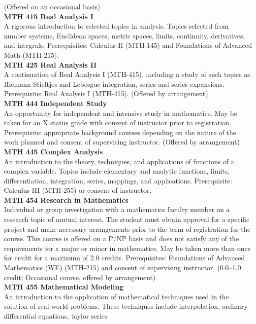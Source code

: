 \documentclass[
  letterpaper,
]{scrbook}
\begin{document}
(Offered on an occasional basis)\\
\textbf{MTH 415 Real Analysis I}\\
A rigorous introduction to selected topics in analysis. Topics selected
from number systems, Euclidean spaces, metric spaces, limits,
continuity, derivatives, and integrals. Prerequisites: Calculus II
(MTH-145) and Foundations of Advanced Math (MTH-215).\\
\textbf{MTH 425 Real Analysis II}\\
A continuation of Real Analysis I (MTH-415), including a study of such
topics as Riemann Stieltjes and Lebesgue integration, series and series
expansions. Prerequisite: Real Analysis I (MTH-415). (Offered by
arrangement)\\
\textbf{MTH 444 Independent Study}\\
An opportunity for independent and intensive study in mathematics. May
be taken for an X status grade with consent of instructor prior to
registration. Prerequisite: appropriate background courses depending on
the nature of the work planned and consent of supervising instructor.
(Offered by arrangement)\\
\textbf{MTH 445 Complex Analysis}\\
An introduction to the theory, techniques, and applications of functions
of a complex variable. Topics include elementary and analytic functions,
limits, differentiation, integration, series, mappings, and
applications. Prerequisite: Calculus III (MTH-255) or consent of
instructor.\\
\textbf{MTH 454 Research in Mathematics}\\
Individual or group investigation with a mathematics faculty member on a
research topic of mutual interest. The student must obtain approval for
a specific project and make necessary arrangements prior to the term of
registration for the course. This course is offered on a P/NP basis and
does not satisfy any of the requirements for a major or minor in
mathematics. May be taken more than once for credit for a maximum of 2.0
credits. Prerequisites: Foundations of Advanced Mathematics (WE)
(MTH-215) and consent of supervising instructor. (0.0--1.0 credit;
Occasional course, offered by arrangement)\\
\textbf{MTH 455 Mathematical Modeling}\\
An introduction to the application of mathematical techniques used in
the solution of real-world problems. These techniques include
interpolation, ordinary differential equations, taylor series
\end{document}
